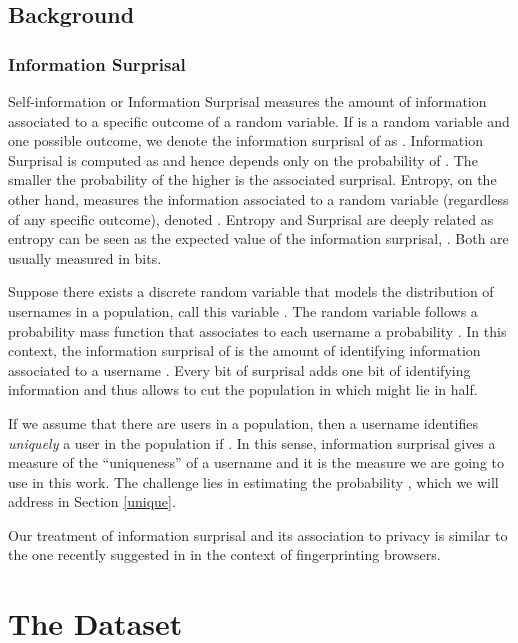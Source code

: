 \documentclass[letterpaper]{sig-alternate}
\begin{document}
\subsection{Background}

\subsubsection{Information Surprisal}

Self-information or Information Surprisal measures the amount of information
associated to a specific outcome of a random variable. If  is a random variable
and  one possible outcome, we denote the information surprisal of  as .
Information Surprisal is computed as  and hence depends
only on the probability of . The smaller the probability of  the higher
is the associated surprisal.
Entropy, on the other
hand, measures the information associated to a random variable (regardless of any
specific outcome), denoted . Entropy and Surprisal are deeply related
as entropy can be seen as the expected value of the information surprisal, .
Both are usually measured in bits.


Suppose there exists a discrete random variable that models the distribution of
usernames in a population, call this variable .
The random variable  follows a probability mass function 
that associates to each username  a probability . In this context,
the information surprisal of  is the
amount of identifying information associated to a username . Every bit
of surprisal adds one bit of identifying information and thus allows to cut the
population in which  might lie in half. 

If we assume that there are  users in a population, then a username 
identifies {\em uniquely} a user in the population if .  In this sense,
information surprisal gives a measure of the ``uniqueness'' of a username 
and it is the measure we are going to use in this work.  The challenge lies in
estimating the probability , which we will address in Section
\ref{unique}.

Our treatment of information surprisal and
its association to privacy is similar to the one recently suggested in
\cite{EFF} in the context of fingerprinting browsers.





\section{The Dataset}
\label{dataset}
\end{document}
